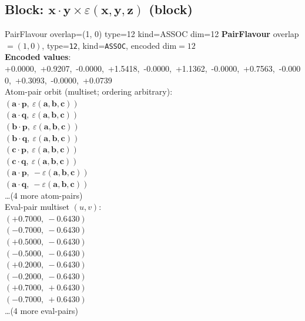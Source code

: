 \documentclass[a4paper,11pt]{article}
\newcommand{\pdcegfomjfhook}[2]{\mathbf{#1} \cdot \mathbf{#2}}
\newcommand{\kblbmcpggoncpf}[3]{\varepsilon(\mathbf{#1},\mathbf{#2},\mathbf{#3})}
\begin{document}
\subsection{Block: $\pdcegfomjfhook{x}{y} \times \kblbmcpggoncpf{x}{y}{z}$  (block)}
    PairFlavour  overlap=(1, 0)  type=12  kind=ASSOC  dim=12
\textbf{PairFlavour} overlap$=(1, 0)$, type=\texttt{12}, kind=\texttt{ASSOC}, encoded dim$=12$\\
\textbf{      Encoded values}: +0.0000,\ +0.9207,\ -0.0000,\ +1.5418,\ -0.0000,\ +1.1362,\ -0.0000,\ +0.7563,\ -0.0000,\ +0.3093,\ -0.0000,\ +0.0739\\
\quad Atom-pair orbit (multiset; ordering arbitrary):\\
$(\pdcegfomjfhook{a}{p},\ \kblbmcpggoncpf{a}{b}{c})$\\
$(\pdcegfomjfhook{a}{q},\ \kblbmcpggoncpf{a}{b}{c})$\\
$(\pdcegfomjfhook{b}{p},\ \kblbmcpggoncpf{a}{b}{c})$\\
$(\pdcegfomjfhook{b}{q},\ \kblbmcpggoncpf{a}{b}{c})$\\
$(\pdcegfomjfhook{c}{p},\ \kblbmcpggoncpf{a}{b}{c})$\\
$(\pdcegfomjfhook{c}{q},\ \kblbmcpggoncpf{a}{b}{c})$\\
$(\pdcegfomjfhook{a}{p},\ -\kblbmcpggoncpf{a}{b}{c})$\\
$(\pdcegfomjfhook{a}{q},\ -\kblbmcpggoncpf{a}{b}{c})$\\
\quad \ldots (4 more atom-pairs)\\
\quad Eval-pair multiset $(u, v)$:\\
$(+0.7000,\ -0.6430)$\\
$(-0.7000,\ -0.6430)$\\
$(+0.5000,\ -0.6430)$\\
$(-0.5000,\ -0.6430)$\\
$(+0.2000,\ -0.6430)$\\
$(-0.2000,\ -0.6430)$\\
$(+0.7000,\ +0.6430)$\\
$(-0.7000,\ +0.6430)$\\
\quad \ldots (4 more eval-pairs)\\
\end{document}
